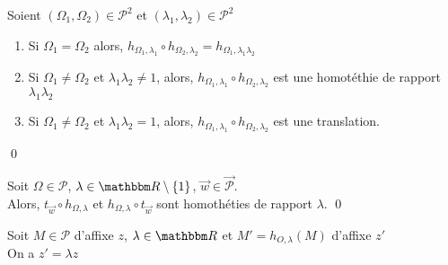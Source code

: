 \begin{prop}
	Soient $(\Omega_1, \Omega_2) \in \mathcal{P}^2$ et $(\lambda_1, \lambda_2) \in \mathcal{P}^2$ \\
	\begin{enumerate}
		\item Si $\Omega_1 = \Omega_2$ alors, $h_{\Omega_1, \lambda_1} \circ h_{\Omega_2, \lambda_2} = h_{\Omega_1, \lambda_1\lambda_2}$
		\item Si $\Omega_1 \neq \Omega_2$ et $\lambda_1\lambda_2\neq 1$, alors, $h_{\Omega_1, \lambda_1} \circ h_{\Omega_2, \lambda_2}$ est une homotéthie de rapport $\lambda_1\lambda_2$
		\item Si $\Omega_1 \neq \Omega_2$ et $\lambda_1\lambda_2 = 1$, alors, $h_{\Omega_1, \lambda_1} \circ h_{\Omega_2, \lambda_2}$ est une translation.
	\end{enumerate}
	\qed
\end{prop}

\begin{prop}
	Soit $\Omega \in \mathcal{P}$, $\lambda \in \R\setminus \{1\}$, $\vec{w} \in \vec{\mathcal{P}}$.\\
	Alors, $t_{\vec{w}} \circ h_{\Omega, \lambda}$ et $h_{\Omega, \lambda} \circ t_{\vec{w}}$ sont homothéties de rapport $\lambda$.
	\qed
\end{prop}

\begin{rmk}
	Soit $M \in \mathcal{P}$ d'affixe $z$, $\lambda\in \R$ et $M' = h_{O, \lambda}(M)$ d'affixe $z'$ \\
	On a $z' = \lambda z$
\end{rmk}

